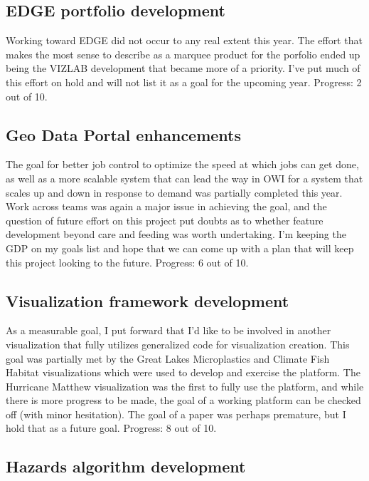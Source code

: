 \documentclass{article}
\begin{document}
\subsection{EDGE portfolio development}

Working toward EDGE did not occur to any real extent this year.
The effort that makes the most sense to describe as a marquee product for the porfolio ended up being the VIZLAB development that became more of a priority.
I've put much of this effort on hold and will not list it as a goal for the upcoming year.
Progress: 2 out of 10.

\subsection{Geo Data Portal enhancements}

The goal for better job control to optimize the speed at which jobs can get done, as well as a more scalable system that can lead the way in OWI for a system that scales up and down in response to demand was partially completed this year.
Work across teams was again a major issue in achieving the goal, and the question of future effort on this project put doubts as to whether feature development beyond care and feeding was worth undertaking.
I'm keeping the GDP on my goals list and hope that we can come up with a plan that will keep this project looking to the future.
Progress: 6 out of 10.


\subsection{Visualization framework development}

As a measurable goal, I put forward that I'd like to be involved in another visualization that fully utilizes generalized code for visualization creation.
This goal was partially met by the Great Lakes Microplastics and Climate Fish Habitat visualizations which were used to develop and exercise the platform.
The Hurricane Matthew visualization was the first to fully use the platform, and while there is more progress to be made, the goal of a working platform can be checked off (with minor hesitation).
The goal of a paper was perhaps premature, but I hold that as a future goal.
Progress: 8 out of 10.

\subsection{Hazards algorithm development}
\end{document}
